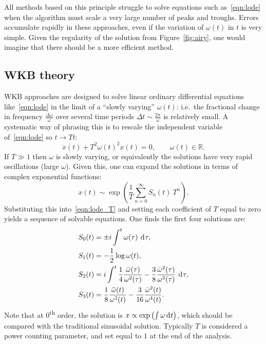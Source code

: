 All methods based on this principle struggle to solve equations such as~\eqref{eqn:lode} when the algorithm must scale a very large number of peaks and troughs. Errors accumulate rapidly in these approaches, even if the variation of $\omega(t)$ in $t$ is very simple. Given the regularity of the solution from Figure~\ref{fig:airy}, one would imagine that there should be a more efficient method.


\subsection{WKB theory}
\label{sec:wkb}
WKB approaches are designed to solve linear ordinary differential equations like~\eqref{eqn:lode} in the limit of a ``slowly varying'' $\omega(t)$: i.e.\ the fractional change in frequency $\frac{\Delta\omega}{\omega}$ over several time periods $\Delta t \sim \frac{2\pi}{\omega}$ is relatively small.
A systematic way of phrasing this is to rescale the independent variable of~\eqref{eqn:lode} so $t\rightarrow T t$:
\begin{equation}
  \ddot{x}(t) + T^2{\omega(t)}^2x(t) = 0,\qquad \omega(t)\in\mathbb{R}.
  \label{eqn:lode_T}
\end{equation}
If $T\gg1$ then $\omega$ is slowly varying, or equivalently the solutions have very rapid oscillations (large $\omega$). Given this, one can expand the solutions in terms of complex exponential functions:
\begin{equation}
  x(t)\sim \exp\left( \frac{1}{T}\sum\limits_{n=0}^{\infty} S_n(t)\: T^n \right).
  \label{eqn:asymp}
\end{equation}
Substituting this into~\eqref{eqn:lode_T} and setting each coefficient of $T$ equal to zero yields a sequence of solvable equations. One finds the first four solutions are:
\begin{align}
  S_0(t) &= \pm i \int^t \omega(\tau)\: \operatorname{d}^{}\!{\tau},
  \label{eqn:S0}\\
  S_1(t) &= -\frac{1}{2}\log \omega(t),\\
  S_2(t) &=  i \int^t \frac{1}{4}\frac{\ddot{\omega}(\tau)}{\omega^{2}(\tau)} - \frac{3}{8}\frac{\dot{\omega}^2(\tau)}{\omega^{3}(\tau)}\: \operatorname{d}^{}\!{\tau}, \\
  S_3(t) &=  \frac{1}{8}\frac{\ddot{\omega}(t)}{\omega^{3}(t)} - \frac{3}{16} \frac{\dot{\omega}^{2}(t)}{\omega^{4}(t)}.
\end{align}
Note that at $0$\textsuperscript{th} order, the solution is $x\propto\exp\left( \int \omega \operatorname{d}^{}\!{t} \right)$, which should be compared with the traditional sinusoidal solution.
Typically $T$ is considered a power counting parameter, and set equal to $1$ at the end of the analysis.

